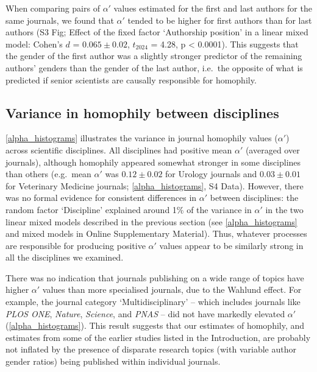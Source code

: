 \documentclass[12pt,]{article}
\begin{document}
When comparing pairs of \(\alpha'\) values estimated for the first and
last authors for the same journals, we found that \(\alpha'\) tended to
be higher for first authors than for last authors (S3 Fig; Effect of the
fixed factor `Authorship position' in a linear mixed model: Cohen's
\(d\) = \(0.065{\pm}0.02\), \(t_{2024}\) = 4.28, p \textless{} 0.0001).
This suggests that the gender of the first author was a slightly
stronger predictor of the remaining authors' genders than the gender of
the last author, i.e.~the opposite of what is predicted if senior
scientists are causally responsible for homophily.

\hypertarget{variance-in-homophily-between-disciplines}{%
\subsection{Variance in homophily between
disciplines}\label{variance-in-homophily-between-disciplines}}

\autoref{alpha_histograms} illustrates the variance in journal homophily
values (\(\alpha'\)) across scientific disciplines. All disciplines had
positive mean \(\alpha'\) (averaged over journals), although homophily
appeared somewhat stronger in some disciplines than others (e.g.~mean
\(\alpha'\) was \(0.12{\pm}0.02\) for Urology journals and
\(0.03{\pm}0.01\) for Veterinary Medicine journals;
\autoref{alpha_histograms}, S4 Data). However, there was no formal
evidence for consistent differences in \(\alpha'\) between disciplines:
the random factor `Discipline' explained around 1\% of the variance in
\(\alpha'\) in the two linear mixed models described in the previous
section (see \autoref{alpha_histograms} and mixed models in Online
Supplementary Material). Thus, whatever processes are responsible for
producing positive \(\alpha'\) values appear to be similarly strong in
all the disciplines we examined.

There was no indication that journals publishing on a wide range of
topics have higher \(\alpha'\) values than more specialised journals,
due to the Wahlund effect. For example, the journal category
`Multidisciplinary' -- which includes journals like \emph{PLOS ONE},
\emph{Nature}, \emph{Science}, and \emph{PNAS} -- did not have markedly
elevated \(\alpha'\) (\autoref{alpha_histograms}). This result suggests
that our estimates of homophily, and estimates from some of the earlier
studies listed in the Introduction, are probably not inflated by the
presence of disparate research topics (with variable author gender
ratios) being published within individual journals.
\end{document}
